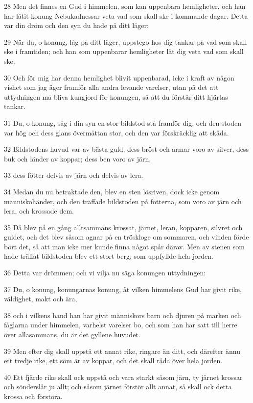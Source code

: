\par 28 Men det finnes en Gud i himmelen, som kan uppenbara hemligheter, och han har låtit konung Nebukadnessar veta vad som skall ske i kommande dagar. Detta var din dröm och den syn du hade på ditt läger:
\par 29 När du, o konung, låg på ditt läger, uppstego hos dig tankar på vad som skall ske i framtiden; och han som uppenbarar hemligheter lät dig veta vad som skall ske.
\par 30 Och för mig har denna hemlighet blivit uppenbarad, icke i kraft av någon vishet som jag äger framför alla andra levande varelser, utan på det att uttydningen må bliva kungjord för konungen, så att du förstår ditt hjärtas tankar.
\par 31 Du, o konung, såg i din syn en stor bildstod stå framför dig, och den stoden var hög och dess glans övermåttan stor, och den var förskräcklig att skåda.
\par 32 Bildstodens huvud var av bästa guld, dess bröst och armar voro av silver, dess buk och länder av koppar; dess ben voro av järn,
\par 33 dess fötter delvis av järn och delvis av lera.
\par 34 Medan du nu betraktade den, blev en sten lösriven, dock icke genom människohänder, och den träffade bildstoden på fötterna, som voro av järn och lera, och krossade dem.
\par 35 Då blev på en gång alltsammans krossat, järnet, leran, kopparen, silvret och guldet, och det blev såsom agnar på en tröskloge om sommaren, och vinden förde bort det, så att man icke mer kunde finna något spår därav. Men av stenen som hade träffat bildstoden blev ett stort berg, som uppfyllde hela jorden.
\par 36 Detta var drömmen; och vi vilja nu säga konungen uttydningen:
\par 37 Du, o konung, konungarnas konung, åt vilken himmelens Gud har givit rike, väldighet, makt och ära,
\par 38 och i vilkens hand han har givit människors barn och djuren på marken och fåglarna under himmelen, varhelst varelser bo, och som han har satt till herre över allasammans, du är det gyllene huvudet.
\par 39 Men efter dig skall uppstå ett annat rike, ringare än ditt, och därefter ännu ett tredje rike, ett som är av koppar, och det skall råda över hela jorden.
\par 40 Ett fjärde rike skall ock uppstå och vara starkt såsom järn, ty järnet krossar och sönderslår ju allt; och såsom järnet förstör allt annat, så skall ock detta krossa och förstöra.
